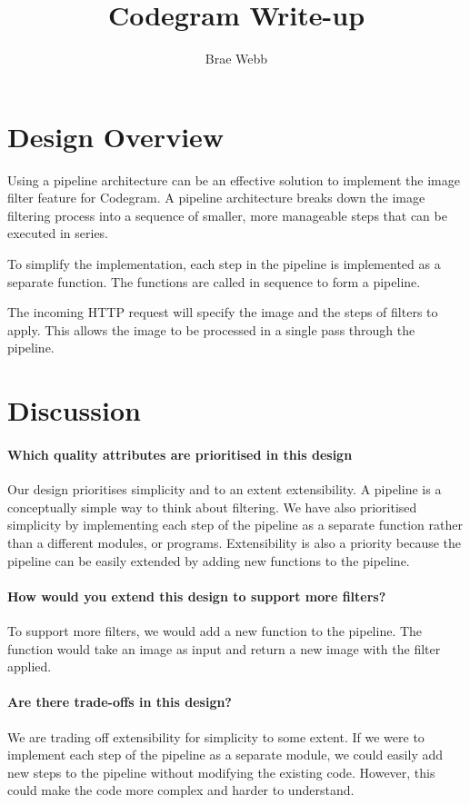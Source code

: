 \documentclass{csse4400}
\title{Codegram Write-up}
\author{Brae Webb}
\date{\week{2}}
\begin{document}
\maketitle

\section{Design Overview}

Using a pipeline architecture can be an effective solution to implement the image filter feature for Codegram.
A pipeline architecture breaks down the image filtering process into a sequence of smaller,
more manageable steps that can be executed in series.

To simplify the implementation,
each step in the pipeline is implemented as a separate function.
The functions are called in sequence to form a pipeline.

The incoming HTTP request will specify the image and the steps of filters to apply.
This allows the image to be processed in a single pass through the pipeline.

\section{Discussion}

\paragraph{Which quality attributes are prioritised in this design}
Our design prioritises simplicity and to an extent extensibility.
A pipeline is a conceptually simple way to think about filtering.
We have also prioritised simplicity by implementing each step of the pipeline as a separate function rather than a different modules, or programs.
Extensibility is also a priority because the pipeline can be easily extended by adding new functions to the pipeline.

\paragraph{How would you extend this design to support more filters?}
To support more filters, we would add a new function to the pipeline.
The function would take an image as input and return a new image with the filter applied.

\paragraph{Are there trade-offs in this design?}
We are trading off extensibility for simplicity to some extent.
If we were to implement each step of the pipeline as a separate module, we could easily add new steps to the pipeline without modifying the existing code.
However, this could make the code more complex and harder to understand.
\end{document}
